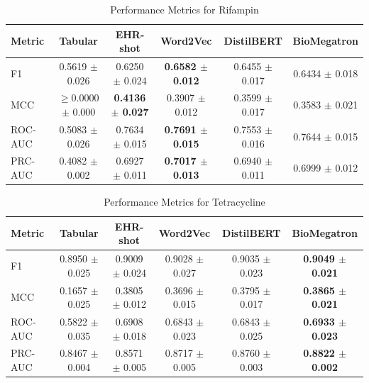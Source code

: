 \documentclass{article}
\theoremstyle{plain}
\theoremstyle{definition}
\theoremstyle{remark}
\begin{document}
\begin{table}[h!]
\caption{Performance Metrics for Rifampin}
\label{table-rifampin}
\vskip 0.15in
\begin{center}
\begin{small}
\begin{sc}
\begin{adjustbox}{width=5in}
\begin{tabular}{l| ccccc}
\toprule
Metric & Tabular & EHR-shot & Word2Vec & DistilBERT & BioMegatron \\
\midrule
F1 & 0.5619 $\pm$ 0.026 & 0.6250 $\pm$ 0.024 & \textbf{0.6582 $\pm$ 0.012} & 0.6455 $\pm$ 0.017 & 0.6434 $\pm$ 0.018 \\
MCC & $\geq$0.0000 $\pm$ 0.000 & \textbf{0.4136 $\pm$ 0.027} & 0.3907 $\pm$ 0.012 & 0.3599 $\pm$ 0.017 & 0.3583 $\pm$ 0.021 \\
ROC-AUC & 0.5083 $\pm$ 0.026 & 0.7634 $\pm$ 0.015 & \textbf{0.7691 $\pm$ 0.015} & 0.7553 $\pm$ 0.016 & 0.7644 $\pm$ 0.015 \\
PRC-AUC & 0.4082 $\pm$ 0.002 & 0.6927 $\pm$ 0.011 & \textbf{0.7017 $\pm$ 0.013} & 0.6940 $\pm$ 0.011 & 0.6999 $\pm$ 0.012 \\
\bottomrule
\end{tabular}
\end{adjustbox}
\end{sc}
\end{small}
\end{center}
\vskip -0.1in
\end{table}


\begin{table}[h!]
\caption{Performance Metrics for Tetracycline}
\label{table-tetracycline}
\vskip 0.15in
\begin{center}
\begin{small}
\begin{sc}
\begin{adjustbox}{width=5in}
\begin{tabular}{l| ccccc}
\toprule
Metric & Tabular & EHR-shot & Word2Vec & DistilBERT & BioMegatron \\
\midrule
F1 & 0.8950 $\pm$ 0.025 & 0.9009 $\pm$ 0.024 & 0.9028 $\pm$ 0.027 & 0.9035 $\pm$ 0.023 & \textbf{0.9049 $\pm$ 0.021} \\
MCC & 0.1657 $\pm$ 0.025 & 0.3805 $\pm$ 0.012 & 0.3696 $\pm$ 0.015 & 0.3795 $\pm$ 0.017 & \textbf{0.3865 $\pm$ 0.021} \\
ROC-AUC & 0.5822 $\pm$ 0.035 & 0.6908 $\pm$ 0.018 & 0.6843 $\pm$ 0.023 & 0.6843 $\pm$ 0.025 & \textbf{0.6933 $\pm$ 0.023} \\
PRC-AUC & 0.8467 $\pm$ 0.004 & 0.8571 $\pm$ 0.005 & 0.8717 $\pm$ 0.005 & 0.8760 $\pm$ 0.003 & \textbf{0.8822 $\pm$ 0.002} \\
\bottomrule
\end{tabular}
\end{adjustbox}
\end{sc}
\end{small}
\end{center}
\vskip -0.1in
\end{table}
\end{document}
